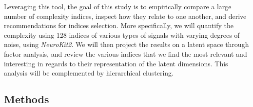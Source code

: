 \documentclass[
  man]{apa6}
\begin{document}
Leveraging this tool, the goal of this study is to empirically compare a large number of complexity indices, inspect how they relate to one another, and derive recommendations for indices selection. More specifically, we will quantify the complexity using 128 indices of various types of signals with varying degrees of noise, using \emph{NeuroKit2}. We will then project the results on a latent space through factor analysis, and review the various indices that we find the most relevant and interesting in regards to their representation of the latent dimensions. This analysis will be complemented by hierarchical clustering.

\hypertarget{methods}{%
\subsection{Methods}\label{methods}}
\end{document}

